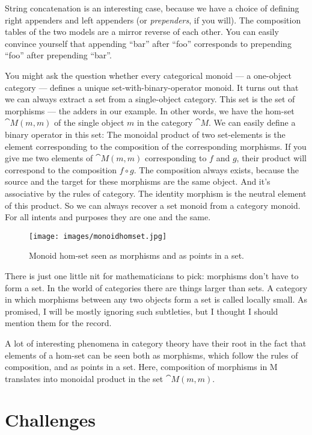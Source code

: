 String concatenation is an interesting case, because we have a choice of
defining right appenders and left appenders (or \emph{prependers}, if
you will). The composition tables of the two models are a mirror reverse
of each other. You can easily convince yourself that appending ``bar''
after ``foo'' corresponds to prepending ``foo'' after prepending
``bar''.

You might ask the question whether every categorical monoid --- a
one-object category --- defines a unique set-with-binary-operator
monoid. It turns out that we can always extract a set from a
single-object category. This set is the set of morphisms --- the adders
in our example. In other words, we have the hom-set $\cat{M}(m, m)$ of the
single object $m$ in the category $\cat{M}$. We can easily define a binary
operator in this set: The monoidal product of two set-elements is the
element corresponding to the composition of the corresponding morphisms.
If you give me two elements of $\cat{M}(m, m)$ corresponding to $f$ and
$g$, their product will correspond to the composition
$f \circ g$. The composition always exists, because the source and the
target for these morphisms are the same object. And it's associative by
the rules of category. The identity morphism is the neutral element of
this product. So we can always recover a set monoid from a category
monoid. For all intents and purposes they are one and the same.

\begin{figure}
\centering
\texttt{[image: images/monoidhomset.jpg]}
\caption{Monoid hom-set seen as morphisms and as points in a set.}
\end{figure}

There is just one little nit for mathematicians to pick: morphisms don't
have to form a set. In the world of categories there are things larger
than sets. A category in which morphisms between any two objects form a
set is called locally small. As promised, I will be mostly ignoring such
subtleties, but I thought I should mention them for the record.

A lot of interesting phenomena in category theory have their root in the
fact that elements of a hom-set can be seen both as morphisms, which
follow the rules of composition, and as points in a set. Here,
composition of morphisms in M translates into monoidal product in the
set $\cat{M}(m, m)$.

\section{Challenges}\label{challenges}

